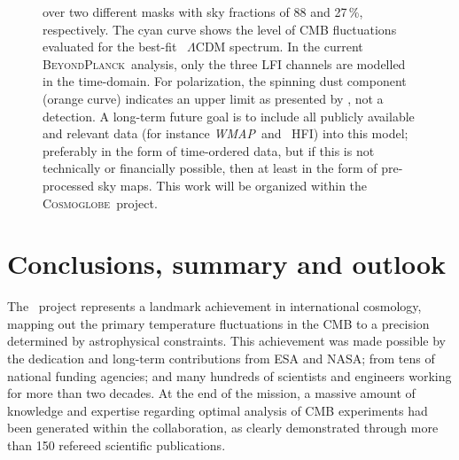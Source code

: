 \documentclass[onecolumn]{aa}
\def\WMAP{\emph{WMAP}}
\newcommand{\BP}{\textsc{BeyondPlanck}}
\newcommand{\cosmoglobe}{\textsc{Cosmoglobe}}
\begin{document}
\begin{figure}[t]
{    over two different masks with sky fractions of 88 and 27\,\%,
    respectively.  The cyan curve shows the level of CMB fluctuations
    evaluated for the best-fit \Planck\ $\Lambda$CDM spectrum. In the
    current \BP\ analysis, only the three LFI channels are modelled in
    the time-domain. For polarization, the spinning dust component
    (orange curve) indicates an upper limit as presented by \citet{bp15},
    not a detection. A long-term future goal is to include all
    publicly available and relevant data (for instance \WMAP\ and
    \Planck\ HFI) into this model; preferably in the form of
    time-ordered data, but if this is not technically or financially
    possible, then at least in the form of pre-processed sky
    maps. This work will be organized within the
    \cosmoglobe\ project.}
  \label{fig:overview_fg}
\end{figure}


\section{Conclusions, summary and outlook}
\label{sec:conclusions}

The \Planck\ project represents a landmark achievement in
international cosmology, mapping out the primary temperature
fluctuations in the CMB to a precision determined by astrophysical
constraints. This achievement was made possible by the dedication and
long-term contributions from ESA and NASA; from tens of national
funding agencies; and many hundreds of scientists and engineers
working for more than two decades. At the end of the mission, a
massive amount of knowledge and expertise regarding optimal analysis
of CMB experiments had been generated within the collaboration, as
clearly demonstrated through more than 150 refereed scientific publications.
\end{document}
